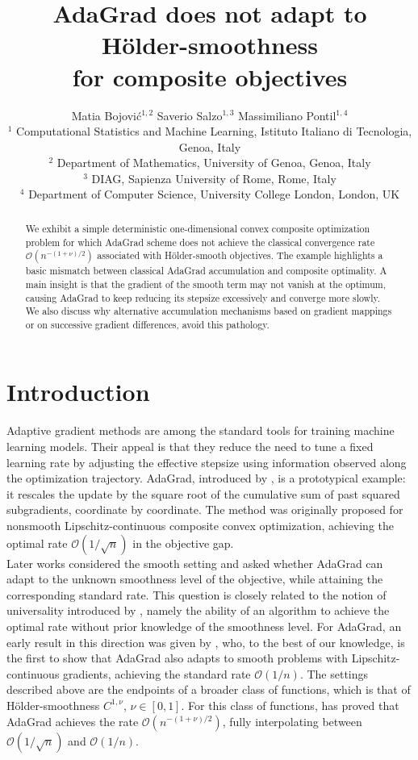 \documentclass[11pt]{article}
\title{AdaGrad does not adapt to H\"older-smoothness \\ for composite objectives}
\author{
Matia Bojovi\'c$^{1,2}$
\quad
Saverio Salzo$^{1,3}$
\quad
Massimiliano Pontil$^{1,4}$
\\
{\small $^1$ Computational Statistics and Machine Learning, Istituto Italiano di Tecnologia, Genoa, Italy}
\\
{\small $^2$ Department of Mathematics, University of Genoa, Genoa, Italy}
\\
{\small $^3$ DIAG, Sapienza University of Rome, Rome, Italy}
\\
{\small $^4$ Department of Computer Science, University College London, London, UK}
}
\date{}
\begin{document}
\maketitle
\begin{abstract}
    \noindent 
    We exhibit a simple deterministic one-dimensional convex composite optimization problem for which AdaGrad scheme does not achieve the classical convergence rate $\mathcal{O}(n^{-(1+\nu)/2})$ associated with  H\"older-smooth objectives. The example highlights a basic mismatch between classical AdaGrad accumulation and composite optimality. A main insight is that the gradient of the smooth term may not vanish at the optimum, causing AdaGrad to keep reducing its stepsize excessively and converge more slowly.  
    We also discuss why alternative accumulation mechanisms based on gradient mappings or on successive gradient differences, avoid this pathology.
\end{abstract}

\section{Introduction}

Adaptive gradient methods are among the standard tools for training machine learning models. Their appeal is that they reduce the need to tune a fixed learning rate by adjusting the effective stepsize using information observed along the optimization trajectory. 
AdaGrad, introduced by \citet{JMLR:v12:duchi11a}, is a prototypical example: it rescales the update by the square root of the cumulative sum of past squared subgradients, coordinate by coordinate. The method was originally proposed for nonsmooth Lipschitz-continuous composite convex optimization, achieving the optimal rate \(\mathcal{O}(1/\sqrt n)\) in the objective gap. \\

\noindent
Later works considered the smooth setting and asked whether AdaGrad can adapt to the unknown smoothness level of the objective, while attaining the corresponding standard rate. This question is closely related to the notion of universality introduced by \citet{nesterov2015universal}, namely the ability of an algorithm to achieve the optimal rate without prior knowledge of the smoothness level.
For AdaGrad, an early result in this direction was given by \citet{levy2018online}, who, to the best of our knowledge, is the first to show that AdaGrad
also adapts to smooth problems with Lipschitz-continuous gradients, achieving the standard rate \(\mathcal O(1/n)\). The settings described above are the endpoints of a broader class of functions, which is that of H\"older-smoothness \(C^{1,\nu}\), $\nu\in[0,1]$. For this class of functions, \citet{orabona2023normalized} has proved that AdaGrad achieves the rate \(\mathcal O(n^{-(1+\nu)/2})\), fully interpolating between \(\mathcal{O}(1/ \sqrt n)\) and \(\mathcal{O}(1/n)\). \\
\end{document}
